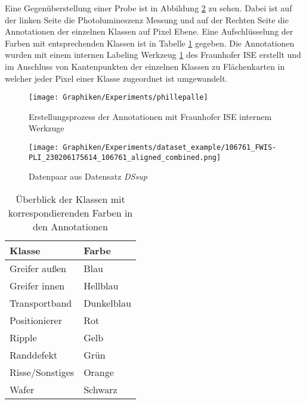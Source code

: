 Eine Gegenüberstellung einer Probe ist in Abbildung \ref{fig:ds_sup} zu sehen. Dabei ist auf der linken Seite die Photolumineszenz Messung und auf der Rechten Seite die Annotationen der einzelnen Klassen auf Pixel Ebene. Eine Aufschlüsselung der Farben mit entsprechenden Klassen ist in Tabelle \ref{tab:classColor} gegeben. Die Annotationen wurden mit einem internen Labeling Werkzeug \ref{fig:phillepalle} des Fraunhofer ISE  erstellt und im Anschluss von Kantenpunkten der einzelnen Klassen zu Flächenkarten in welcher jeder Pixel einer Klasse zugeordnet ist umgewandelt.  


\begin{figure}[h!]
	\centering
	\texttt{[image: Graphiken/Experiments/phillepalle]}
	\caption{Erstellungsprozess der Annotationen mit Fraunhofer ISE internem Werkzuge}
	\label{fig:phillepalle}
\end{figure}

\begin{figure}[h!]
	\centering
	\texttt{[image: Graphiken/Experiments/dataset\_example/106761\_FWIS-PLI\_230206175614\_106761\_aligned\_combined.png]}
	\caption{Datenpaar aus Datensatz \textit{DS\textunderscore sup}}
	\label{fig:ds_sup}
\end{figure}

\begin{table}[h!]
	\centering
	\begin{tabular}{ll}
		\toprule
		 	\textbf{Klasse} & 	\textbf{Farbe}   \\ 
		\midrule \midrule
			Greifer außen  	& 	Blau \\ 
			Greifer innen 	& 	Hellblau  \\ 
			Transportband  	& 	Dunkelblau  \\
			Positionierer 	&  	Rot \\
			Ripple   		&  	Gelb     \\
			Randdefekt		&   Grün   \\
			Risse/Sonstiges	& 	Orange \\
			Wafer 			&   Schwarz     \\
		\bottomrule
	\end{tabular}
	\caption{Überblick der Klassen mit korrespondierenden Farben in den Annotationen
	}
	\label{tab:classColor}
\end{table}

